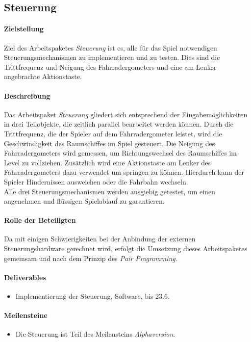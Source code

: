 \subsection{Steuerung}

\paragraph{Zielstellung}\noindent
Ziel des Arbeitspaketes \textit{Steuerung} ist es, alle für das Spiel notwendigen Steuerungsmechanismen zu implementieren und zu testen. Dies sind die Trittfrequenz und Neigung des Fahrradergometers und eine am Lenker angebrachte Aktionstaste.

\paragraph{Beschreibung}\noindent
Das Arbeitspaket \textit{Steuerung} gliedert sich entsprechend der Eingabemöglichkeiten in drei Teilobjekte, die zeitlich parallel bearbeitet werden können. Durch die Trittfrequenz, die der Spieler auf dem Fahrradergometer leistet, wird die Geschwindigkeit des Raumschiffes im Spiel gesteuert. Die Neigung des Fahrradergometers wird gemessen, um Richtungswechsel des Raumschiffes im Level zu vollziehen. Zusätzlich wird eine Aktionstaste am Lenker des Fahrradergometers dazu verwendet um springen zu können. Hierdurch kann der Spieler Hindernissen ausweichen oder die Fahrbahn wechseln.\\
Alle drei Steuerungsmechanismen werden ausgiebig getestet, um einen angenehmen und flüssigen Spielablauf zu garantieren.

\paragraph{Rolle der Beteiligten}\noindent
Da mit einigen Schwierigkeiten bei der Anbindung der externen Steuerungshardware gerechnet wird, erfolgt die Umsetzung dieses Arbeitspaketes gemeinsam und nach dem Prinzip des \textit{Pair Programming}\cite[S. 42ff]{xp}.

\paragraph{Deliverables}\noindent
\begin{itemize}
\item Implementierung der Steuerung, Software, bis 23.6.
\end{itemize}

\paragraph{Meilensteine}\noindent
\begin{itemize}
\item Die Steuerung ist Teil des Meilensteins \textit{Alphaversion}.
\end{itemize}